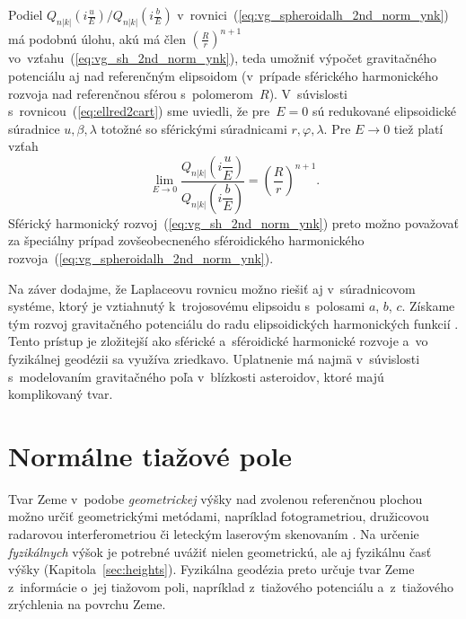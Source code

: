 \documentclass[a4paper, 12pt]{book}
\begin{document}
Podiel $Q_{n|k|}\left( i \frac{u}{E} \right) \slash Q_{n|k|}\left( 
i \frac{b}{E} \right)$ v~rovnici~(\ref{eq:vg_spheroidalh_2nd_norm_ynk}) má 
podobnú úlohu, akú má člen $\left( \frac{R}{r} \right)^{n + 1}$ 
vo~vzťahu~(\ref{eq:vg_sh_2nd_norm_ynk}), teda umožniť výpočet gravitačného 
potenciálu aj nad referenčným elipsoidom (v~prípade sférického harmonického 
rozvoja nad referenčnou sférou s~polomerom~$R$).  V~súvislosti 
s~rovnicou~(\ref{eq:ellred2cart}) sme uviedli, že pre~$E = 0$ sú redukované 
elipsoidické súradnice $u, \beta, \lambda$ totožné so sférickými súradnicami 
$r, \varphi, \lambda$.  Pre $E \rightarrow 0$ tiež platí vzťah 
\parencite{MoritzPhysicalGeodesy}
%
\begin{equation}
\lim_{E \rightarrow 0} \frac{Q_{n|k|}\left( i \dfrac{u}{E} 
\right)}{Q_{n|k|}\left( i \dfrac{b}{E} \right)} = \left( \frac{R}{r} \right)^{n 
+ 1}{.}
\end{equation}
%
Sférický harmonický rozvoj~(\ref{eq:vg_sh_2nd_norm_ynk}) preto možno považovať 
za špeciálny prípad zovšeobecneného sféroidického harmonického 
rozvoja~(\ref{eq:vg_spheroidalh_2nd_norm_ynk}).

Na záver dodajme, že Laplaceovu rovnicu možno riešiť aj v~súradnicovom systéme, 
ktorý je vztiahnutý k~trojosovému elipsoidu s~polosami $a$, $b$, $c$.  Získame 
tým rozvoj gravitačného potenciálu do radu elipsoidických harmonických funkcií 
\parencite[napríklad][]{Garmier2001,Hu2015,Reimond2016}.  Tento prístup je 
zložitejší ako sférické a~sféroidické harmonické rozvoje a~vo fyzikálnej 
geodézii sa využíva zriedkavo.  Uplatnenie má najmä v~súvislosti s~modelovaním 
gravitačného poľa v~blízkosti asteroidov, ktoré majú komplikovaný tvar.










\chapter{Normálne tiažové pole}
\label{sec:normal_gravity_field}

Tvar Zeme v~podobe \emph{geometrickej} výšky nad zvolenou referenčnou plochou 
možno určiť geometrickými metódami, napríklad fotogrametriou, družicovou 
radarovou interferometriou či leteckým laserovým skenovaním \parencite[pozri 
napríklad][]{Hirt2014c}.  Na určenie \emph{fyzikálnych} výšok je potrebné 
uvážiť nielen geometrickú, ale aj fyzikálnu časť výšky 
(Kapitola~\ref{sec:heights}).  Fyzikálna geodézia preto určuje tvar Zeme 
z~informácie o~jej tiažovom poli, napríklad z~tiažového potenciálu 
a~z~tiažového zrýchlenia na povrchu Zeme.
\end{document}
